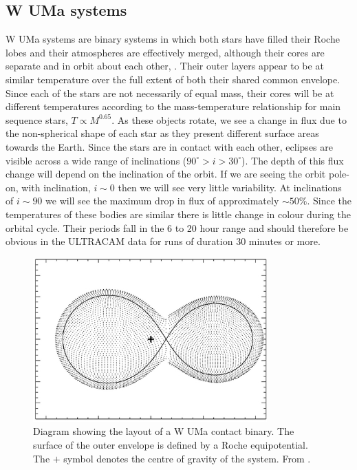 \subsection{{W UMa} systems}
{W UMa} systems are binary systems in which both stars have filled their Roche lobes and their atmospheres are effectively merged, although their cores are separate and in orbit about each other, \citep{Lucy68}. Their outer layers appear to be at similar temperature over the full extent of both their shared common envelope. Since each of the stars are not necessarily of equal mass, their cores will be at different temperatures according to the mass-temperature relationship for main sequence stars, $T \propto M^{0.65}$.  As these objects rotate, we see a change in flux due to the non-spherical shape of each star as they present different surface areas towards the Earth. Since the stars are in contact with each other, eclipses are visible across a wide range of inclinations ($90^\circ > i > 30^\circ$). The depth of this flux change will depend on the inclination of the orbit. If we are seeing the orbit pole-on, with inclination, $i \sim 0$ then we will see very little variability. At inclinations of $i \sim 90$ we will see the maximum drop in flux of approximately $\sim50\%$. Since the temperatures of these bodies are similar there is little change in colour during the orbital cycle. Their periods fall in the 6 to 20 hour range and should therefore be obvious in the ULTRACAM data for runs of duration 30 minutes or more. 

\begin{figure}
\centering
\includegraphics[width=90mm]{images/wuma_diagram.png}
\caption{Diagram showing the layout of a {W UMa} contact binary. The surface of the outer envelope is defined by a Roche equipotential. The $+$ symbol denotes the centre of gravity of the system.  From \citet{0004-637X-764-1-62}. }
\label{fig:wumadiagram}
\end{figure}

